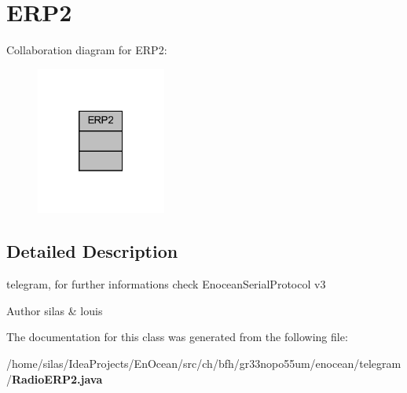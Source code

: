 \section{E\+R\+P2}
\label{classERP2}


Collaboration diagram for E\+R\+P2\+:\nopagebreak
\begin{figure}[H]
\begin{center}
\leavevmode
\includegraphics[width=121pt]{d3/d6c/classERP2__coll__graph}
\end{center}
\end{figure}


\subsection{Detailed Description}
telegram, for further informations check Enocean\+Serial\+Protocol v3

\begin{DoxyAuthor}{Author}
silas \& louis 
\end{DoxyAuthor}


The documentation for this class was generated from the following file\+:\begin{DoxyCompactItemize}
\item 
/home/silas/\+Idea\+Projects/\+En\+Ocean/src/ch/bfh/gr33nopo55um/enocean/telegram/{\bf Radio\+E\+R\+P2.\+java}\end{DoxyCompactItemize}
